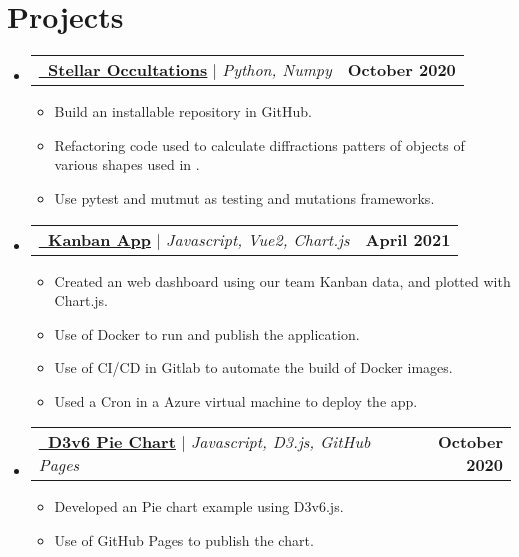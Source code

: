 \documentclass[letterpaper,11pt]{article}
\makeatletter
\newcommand{\resumeItem}[1]{
  \item\small{
    {#1 \vspace{-2pt}}
  }
}
\newcommand{\resumeProjectHeading}[2]{
    \item
    \begin{tabular*}{1.001\textwidth}{l@{\extracolsep{\fill}}r}
      \small#1 & \textbf{\small #2}\\
    \end{tabular*}\vspace{-7pt}
}
\newcommand{\resumeSubHeadingListStart}{\begin{itemize}[leftmargin=0.0in, label={}]}
\newcommand{\resumeSubHeadingListEnd}{\end{itemize}}
\newcommand{\resumeItemListStart}{\begin{itemize}}
\newcommand{\resumeItemListEnd}{\end{itemize}\vspace{-5pt}}
\makeatother
\begin{document}
\section{Projects}
    \resumeSubHeadingListStart
      \resumeProjectHeading
          {\textbf{\href{https://github.com/ferwazz/stellar_occultations}{\raisebox{-0.2\height}\faGithub\ \underline{Stellar Occultations}}} $|$ \emph{Python, Numpy}}{October 2020}
          \resumeItemListStart
            \resumeItem{Build an installable repository in GitHub.}
            \resumeItem{Refactoring code used to calculate diffractions patters of objects of various shapes used in \cite{castro2019occultations}.}
            \resumeItem{Use pytest and mutmut as testing and mutations frameworks.}
          \resumeItemListEnd
          \vspace{-13pt} 
      \resumeProjectHeading
          {\textbf{\href{http://islasgeci.org:8501/}{\raisebox{-0.2\height}\faGitlab\ \underline{Kanban App}} } $|$ \emph{Javascript, Vue2, Chart.js}}{April 2021}
          \resumeItemListStart
            \resumeItem{Created an web dashboard using our team Kanban data, and plotted with Chart.js.}
            \resumeItem{Use of Docker to run and publish the application.}
            \resumeItem{Use of CI/CD in Gitlab to automate the build of Docker images.}
            \resumeItem{Used a Cron in a Azure virtual machine to deploy the app.}
          \resumeItemListEnd 
          \vspace{-13pt}
      \resumeProjectHeading
          {\textbf{\href{https://ferwazz.github.io/d3examples/}{\raisebox{-0.2\height}\faGithub\ \underline{D3v6 Pie Chart}}} $|$ \emph{Javascript, D3.js, GitHub Pages}}{October 2020}
          \resumeItemListStart
            \resumeItem{Developed an Pie chart example using D3v6.js.}
            \resumeItem{Use of GitHub Pages to publish the chart.}
          \resumeItemListEnd
          \resumeSubHeadingListEnd
\vspace{-15pt}
\end{document}
